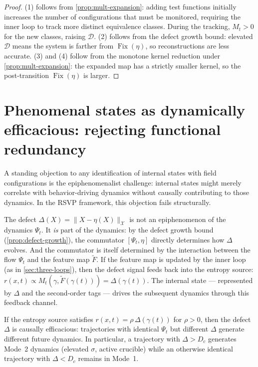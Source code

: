 \documentclass[12pt, oneside]{memoir}
\DeclareMathOperator{\Fix}{Fix}
\newcommand{\X}{\mathcal{X}}
\newcommand{\Ft}{\widetilde{F}}
\newcommand{\nnorm}[1]{\lVert #1 \rVert}
\begin{document}
\begin{proof}
(1) follows from \cref{prop:mult-expansion}: adding test functions initially increases
the number of configurations that must be monitored, requiring the inner loop to track
more distinct equivalence classes.  During the tracking, $M_t > 0$ for the new
classes, raising $\mathcal{D}$.  (2) follows from the defect growth bound: elevated
$\mathcal{D}$ means the system is farther from $\Fix(\eta)$, so reconstructions are
less accurate.  (3) and (4) follow from the monotone kernel reduction under
\cref{prop:mult-expansion}: the expanded map has a strictly smaller kernel, so the
post-transition $\Fix(\eta)$ is larger.
\end{proof}

\section{Phenomenal states as dynamically efficacious: rejecting functional redundancy}
\label{sec:phenomenal-efficacy}

A standing objection to any identification of internal states with field configurations
is the epiphenomenalist challenge: internal states might merely correlate with
behavior-driving dynamics without causally contributing to those dynamics.  In the RSVP
framework, this objection fails structurally.

The defect $\Delta(X) = \nnorm{X - \eta(X)}_\X$ is not an epiphenomenon of the dynamics
$\Psi_t$.  It \emph{is} part of the dynamics: by the defect growth bound
(\cref{prop:defect-growth}), the commutator $[\Psi_t, \eta]$ directly determines how
$\Delta$ evolves.  And the commutator is itself determined by the interaction between the
flow $\Psi_t$ and the feature map $\Ft$.  If the feature map is updated by the inner
loop (as in \cref{sec:three-loops}), then the defect signal feeds back into the entropy
source: $r(x,t) \propto M_t(\gamma, \Ft(\gamma(t))) = \Delta(\gamma(t))$.  The
internal state — represented by $\Delta$ and the second-order tags — drives the
subsequent dynamics through this feedback channel.

\begin{proposition}
\label{prop:efficacy}
If the entropy source satisfies $r(x,t) = \rho\, \Delta(\gamma(t))$ for $\rho > 0$,
then the defect $\Delta$ is causally efficacious: trajectories with identical $\Psi_t$
but different $\Delta$ generate different future dynamics.  In particular, a trajectory
with $\Delta > D_c$ generates Mode~2 dynamics (elevated $\sigma$, active crucible)
while an otherwise identical trajectory with $\Delta < D_c$ remains in Mode~1.
\end{proposition}
\end{document}
